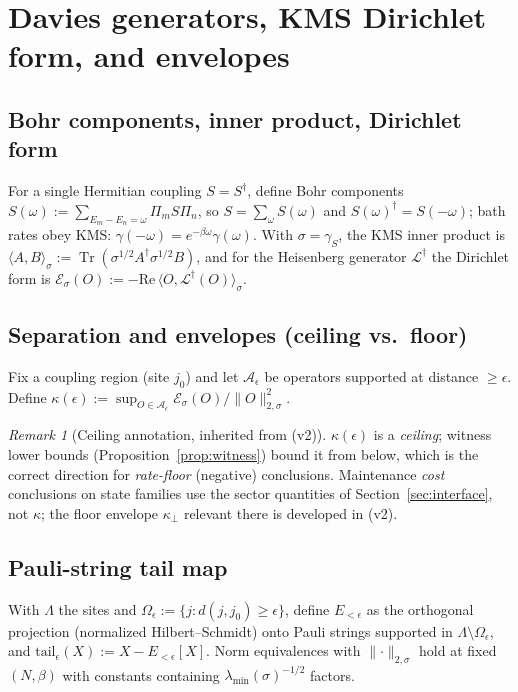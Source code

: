 \documentclass[11pt,a4paper]{article}
\theoremstyle{plain}
\theoremstyle{definition}
\theoremstyle{remark}
\newtheorem{remark}[theorem]{Remark}
\newcommand{\Tr}{\operatorname{Tr}}
\newcommand{\eps}{\epsilon}
\newcommand{\normsig}[1]{\lVert #1 \rVert_{2,\sigma}}
\begin{document}
\section{Davies generators, KMS Dirichlet form, and envelopes}

\subsection{Bohr components, inner product, Dirichlet form}

For a single Hermitian coupling $S = S^\dagger$, define Bohr components
$S(\omega) := \sum_{E_m - E_n = \omega}\Pi_m S\Pi_n$, so $S =
\sum_\omega S(\omega)$ and $S(\omega)^\dagger = S(-\omega)$; bath rates obey
KMS: $\gamma(-\omega) = e^{-\beta\omega}\gamma(\omega)$. With $\sigma =
\gamma_S$, the KMS inner product is $\langle A, B\rangle_\sigma :=
\Tr(\sigma^{1/2}A^\dagger\sigma^{1/2}B)$, and for the Heisenberg generator
$\mathcal{L}^\dagger$ the Dirichlet form is $\mathcal{E}_\sigma(O) :=
-\mathrm{Re}\,\langle O, \mathcal{L}^\dagger(O)\rangle_\sigma$.

\subsection{Separation and envelopes (ceiling vs.\ floor)}

Fix a coupling region (site $j_0$) and let $\mathcal{A}_\eps$ be operators
supported at distance $\ge \eps$. Define
$\kappa(\eps) := \sup_{O\in\mathcal{A}_\eps}
\mathcal{E}_\sigma(O)/\normsig{O}^2$.

\begin{remark}[Ceiling annotation, inherited from \cite{Stress} (v2)]
$\kappa(\eps)$ is a \emph{ceiling}; witness lower bounds
(Proposition~\ref{prop:witness}) bound it from below, which is the correct
direction for \emph{rate-floor} (negative) conclusions. Maintenance
\emph{cost} conclusions on state families use the sector quantities of
Section~\ref{sec:interface}, not $\kappa$; the floor envelope
$\kappa_\perp$ relevant there is developed in \cite{Stress} (v2).
\end{remark}

\subsection{Pauli-string tail map}

With $\Lambda$ the sites and $\Omega_\eps := \{j : d(j, j_0) \ge \eps\}$,
define $E_{<\eps}$ as the orthogonal projection (normalized Hilbert--Schmidt)
onto Pauli strings supported in $\Lambda\setminus\Omega_\eps$, and
$\mathrm{tail}_\eps(X) := X - E_{<\eps}[X]$. Norm equivalences with
$\normsig{\cdot}$ hold at fixed $(N, \beta)$ with constants containing
$\lambda_{\min}(\sigma)^{-1/2}$ factors.
\end{document}
